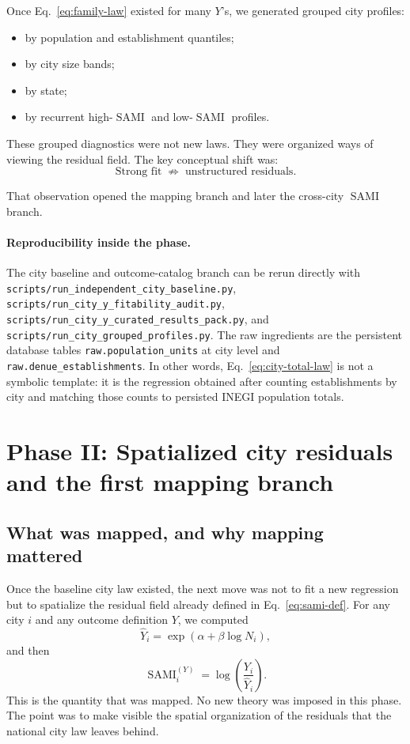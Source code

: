 \documentclass[11pt]{article}
\newcommand{\SAMI}{\operatorname{SAMI}}
\begin{document}
Once Eq.~\eqref{eq:family-law} existed for many \(Y\)'s, we generated grouped city profiles:
\begin{itemize}
\item by population and establishment quantiles;
\item by city size bands;
\item by state;
\item by recurrent high-\(\SAMI\) and low-\(\SAMI\) profiles.
\end{itemize}

These grouped diagnostics were not new laws. They were organized ways of viewing the residual field. The key conceptual shift was:
\begin{equation}
\text{Strong fit} \;\not\Rightarrow\; \text{unstructured residuals}.
\end{equation}

That observation opened the mapping branch and later the cross-city \(\SAMI\) branch.

\paragraph{Reproducibility inside the phase.}
The city baseline and outcome-catalog branch can be rerun directly with
\texttt{scripts/run\_independent\_city\_baseline.py},
\texttt{scripts/run\_city\_y\_fitability\_audit.py},
\texttt{scripts/run\_city\_y\_curated\_results\_pack.py},
and
\texttt{scripts/run\_city\_grouped\_profiles.py}.
The raw ingredients are the persistent database tables
\texttt{raw.population\_units} at city level and
\texttt{raw.denue\_establishments}.
In other words, Eq.~\eqref{eq:city-total-law} is not a symbolic template: it is the regression obtained after counting establishments by city and matching those counts to persisted INEGI population totals.

\section{Phase II: Spatialized city residuals and the first mapping branch}

\subsection{What was mapped, and why mapping mattered}

Once the baseline city law existed, the next move was not to fit a new regression but to spatialize the residual field already defined in Eq.~\eqref{eq:sami-def}. For any city \(i\) and any outcome definition \(Y\), we computed
\begin{equation}
\widehat{Y}_i = \exp\!\left(\alpha+\beta\log N_i\right),
\end{equation}
and then
\begin{equation}
\SAMI_i^{(Y)} = \log\!\left(\frac{Y_i}{\widehat{Y}_i}\right).
\label{eq:phase2-sami}
\end{equation}
This is the quantity that was mapped. No new theory was imposed in this phase. The point was to make visible the spatial organization of the residuals that the national city law leaves behind.
\end{document}
